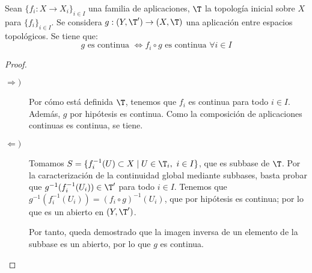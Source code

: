 \begin{prop}
    Sean $\{f_i:X\to X_i\}_{i\in I}$ una familia de aplicaciones, $\T$ la topología inicial sobre $X$ para $\{f_i\}_{i\in I}$. Se considera $g:(Y,\T')\to (X,\T)$ una aplicación entre espacios topológicos. Se tiene que:
    \begin{equation*}
        g \text{ es continua }\Longleftrightarrow f_i\circ g \text{ es continua } \forall i\in I
    \end{equation*}
\end{prop}
\begin{proof}\
\begin{description}
    \item[$\Longrightarrow)$] Por cómo está definida $\T$, tenemos que $f_i$ es continua para todo $i\in I$. Además, $g$ por hipótesis es continua.
    Como la composición de aplicaciones continuas es continua, se tiene.

    \item[$\Longleftarrow)$] Tomamos $S=\{f_i^{-1}(U)\subset X\mid U\in \T_i,~ i\in I\}$, que es subbase de $\T$. Por la caracterización de la continuidad global mediante subbases, basta probar que $g^{-1}(f_i^{-1}(U_i))\in \T'$ para todo $i\in I$. Tenemos que $g^{-1}(f_i^{-1}(U_i))=(f_i\circ g)^{-1}(U_i)$, que por hipótesis es continua; por lo que es un abierto en $(Y,\T')$.

    Por tanto, queda demostrado que la imagen inversa de un elemento de la subbase es un abierto, por lo que $g$ es continua.
\end{description}
\end{proof}

